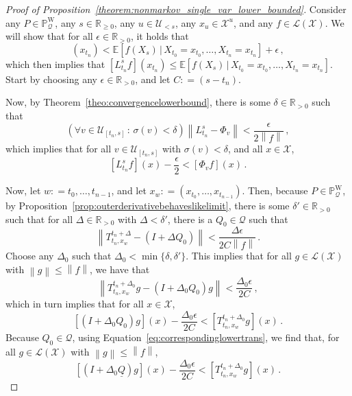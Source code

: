\documentclass[10pt]{paper}
\theoremstyle{definition}
\newcommand{\reals}{\mathbb{R}}
\newcommand{\realspos}{\reals_{>0}}
\newcommand{\realsnonneg}{\reals_{\geq 0}}
\newcommand{\states}{\mathcal{X}}
\newcommand{\processes}{\mathbb{P}}
\newcommand{\wprocesses}{\processes^{\mathrm{W}}}
\newcommand{\gambles}{\mathcal{L}}
\newcommand{\gamblesX}{\gambles(\states)}
\newcommand{\rateset}{\mathcal{Q}}
\newcommand{\lrate}{\underline{Q}}
\newcommand{\norm}[1]{\left\lVert #1 \right\rVert}
\newcommand{\coloneqq}{:\!=}
\begin{document}
\begin{proof}[Proof of Proposition~\ref{theorem:nonmarkov_single_var_lower_bounded}]
Consider any $P\in\wprocesses_\rateset$, any $s\in\realsnonneg$, any $u\in\mathcal{U}_{<s}$, any $x_u\in\states^u$, and any $f\in\gamblesX$. We will show that for all $\epsilon\in\realspos$, it holds that 
\begin{equation*}
[L_{t_n}^s f](x_{t_n}) < \mathbb{E}[f(X_s)\,\vert\,X_{t_0}=x_{t_0},\ldots,X_{t_n}=x_{t_n}] + \epsilon\,,
\end{equation*}
which then implies that $[L_{t_n}^s f](x_{t_n}) \leq \mathbb{E}[f(X_s)\,\vert\,X_{t_0}=x_{t_0},\ldots,X_{t_n}=x_{t_n}]$. Start by choosing any $\epsilon\in\realspos$, and let $C\coloneqq(s-t_n)$. 

Now, by Theorem~\ref{theo:convergencelowerbound}, there is some $\delta\in\realspos$ such that
\begin{equation*}
(\forall v\in\mathcal{U}_{[t_n,s]}\,:\,\sigma(v)<\delta) \norm{L_{t_n}^s - \Phi_v} < \frac{\epsilon}{2\norm{f}}\,,
\end{equation*}
which implies that for all $v\in\mathcal{U}_{[t_n,s]}$ with $\sigma(v)<\delta$, and all $x\in\states$,
\begin{equation}\label{eq:lowerbound_proof_linear_approx_lbound}
\left[L_{t_n}^sf\right](x) - \frac{\epsilon}{2} < \left[\Phi_vf\right](x)\,.
\end{equation}

Now, let $w\coloneqq t_0,\ldots,t_{n-1}$, and let $x_w\coloneqq(x_{t_0},\ldots,x_{t_{n-1}})$. Then, because $P\in\wprocesses_\rateset$, by Proposition~\ref{prop:outerderivativebehaveslikelimit}, there is some $\delta'\in\realspos$ such that for all $\Delta\in\realspos$ with $\Delta<\delta'$, there is a $Q_0\in\rateset$ such that
\begin{equation*}
\norm{T_{t_n,x_w}^{t_n+\Delta} - (I+\Delta Q_0)} < \frac{\Delta\epsilon}{2C\norm{f}}\,.
\end{equation*}
Choose any $\Delta_0$ such that $\Delta_0<\min\{\delta,\delta'\}$. This implies that for all $g\in\gamblesX$ with $\norm{g}\leq\norm{f}$, we have that
\begin{equation*}
\norm{T_{t_n,x_w}^{t_n+\Delta_0}g - (I+\Delta_0 Q_0)g} < \frac{\Delta_0\epsilon}{2C}\,,
\end{equation*}
which in turn implies that for all $x\in\states$,
\begin{equation*}
\left[(I+\Delta_0 Q_0)g\right](x) - \frac{\Delta_0\epsilon}{2C} < \left[T_{t_n,x_w}^{t_n+\Delta_0}g\right](x)\,.
\end{equation*}
Because $Q_0\in\rateset$, using Equation~\eqref{eq:correspondinglowertrans}, we find that, for all $g\in\gamblesX$ with $\norm{g}\leq\norm{f}$,
\begin{equation}\label{eq:lowerbound_proof_linear_approx_last_part}
\left[(I+\Delta_0 \lrate)g\right](x) - \frac{\Delta_0\epsilon}{2C} < \left[T_{t_n,x_w}^{t_n+\Delta_0}g\right](x)\,.
\end{equation}


\end{proof}
\end{document}
